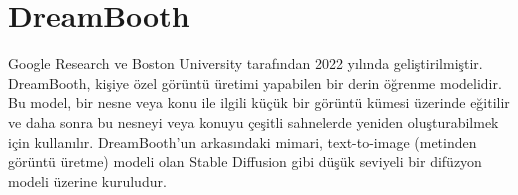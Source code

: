 \section{DreamBooth}

Google Research ve Boston University tarafından 2022 yılında geliştirilmiştir. DreamBooth, kişiye özel görüntü üretimi yapabilen bir derin öğrenme modelidir. Bu model, bir nesne veya konu ile ilgili küçük bir görüntü kümesi üzerinde eğitilir ve daha sonra bu nesneyi veya konuyu çeşitli sahnelerde yeniden oluşturabilmek için kullanılır.  DreamBooth’un arkasındaki mimari, text-to-image (metinden görüntü üretme) modeli olan Stable Diffusion gibi düşük seviyeli bir difüzyon modeli üzerine kuruludur.



\newpage